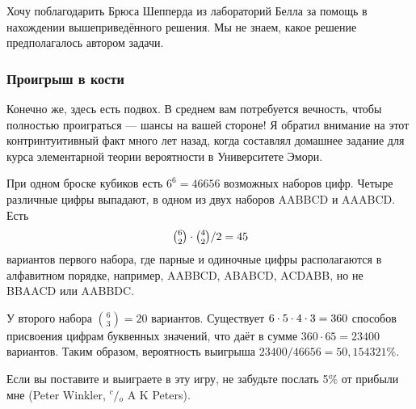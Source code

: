 Хочу поблагодарить Брюса Шепперда %
из лабораторий Белла %
за помощь в нахождении вышеприведённого решения.
Мы не знаем, какое решение предполагалось автором задачи.

\subsubsection*{Проигрыш в кости}%

Конечно же, здесь есть подвох.
В среднем вам потребуется вечность, чтобы полностью проиграться --- шансы на вашей стороне! 
Я обратил внимание на этот контринтуитивный факт много лет назад, когда составлял домашнее задание для курса элементарной теории вероятности в Университете Эмори.

При одном броске кубиков есть $6^6 =46656$ возможных наборов цифр.
Четыре различные цифры выпадают, в одном из двух наборов AABBCD и AAABCD.
Есть
\[\tbinom62\cdot\tbinom42/2=45\]
вариантов первого набора, где парные и одиночные цифры располагаются в алфавитном порядке, например, AABBCD, ABABCD, ACDABB, но не BBAACD или AABBDC.

У второго набора $\binom63=20$  вариантов.
Существует $6\cdot 5\cdot 4\cdot 3\z=360$ способов присвоения цифрам буквенных значений, что даёт в сумме $360\cdot 65=23400$ вариантов.
Таким образом, вероятность выигрыша
$23400/46656 = 50{,}154321\%$.
\heart

Если вы поставите и выиграете в эту игру, не забудьте послать 5\% от прибыли мне 
(Peter Winkler, ${^c\!/\!_o}$ A  K Peters).
